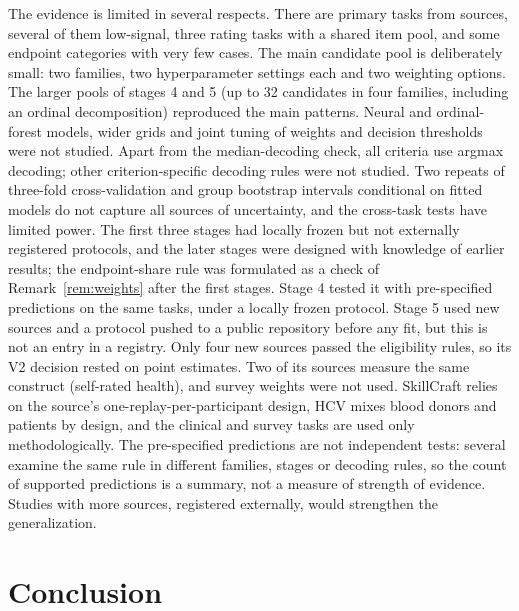 \documentclass[pdflatex,sn-mathphys-ay]{sn-jnl}
\theoremstyle{thmstyleone}
\theoremstyle{thmstylethree}
\begin{document}
The evidence is limited in several respects. There are \NPrimary{} primary tasks from \NFamiliesPrimary{} sources, several of them low-signal, three rating tasks with a shared item pool, and some endpoint categories with very few cases. The main candidate pool is deliberately small: two families, two hyperparameter settings each and two weighting options. The larger pools of stages 4 and 5 (up to 32 candidates in four families, including an ordinal decomposition) reproduced the main patterns. Neural and ordinal-forest models, wider grids and joint tuning of weights and decision thresholds were not studied. Apart from the median-decoding check, all criteria use argmax decoding; other criterion-specific decoding rules \citep{Delgado2026} were not studied. Two repeats of three-fold cross-validation and group bootstrap intervals conditional on fitted models do not capture all sources of uncertainty, and the cross-task tests have limited power. The first three stages had locally frozen but not externally registered protocols, and the later stages were designed with knowledge of earlier results; the endpoint-share rule was formulated as a check of Remark~\ref{rem:weights} after the first stages. Stage 4 tested it with pre-specified predictions on the same tasks, under a locally frozen protocol. Stage 5 used new sources and a protocol pushed to a public repository before any fit, but this is not an entry in a registry. Only four new sources passed the eligibility rules, so its V2 decision rested on point estimates. Two of its sources measure the same construct (self-rated health), and survey weights were not used. SkillCraft relies on the source's one-replay-per-participant design, HCV mixes blood donors and patients by design, and the clinical and survey tasks are used only methodologically. The \PredAllN{} pre-specified predictions are not independent tests: several examine the same rule in different families, stages or decoding rules, so the count of supported predictions is a summary, not a measure of strength of evidence. Studies with more sources, registered externally, would strengthen the generalization.

\section{Conclusion}\label{sec:conclusion}
\end{document}
